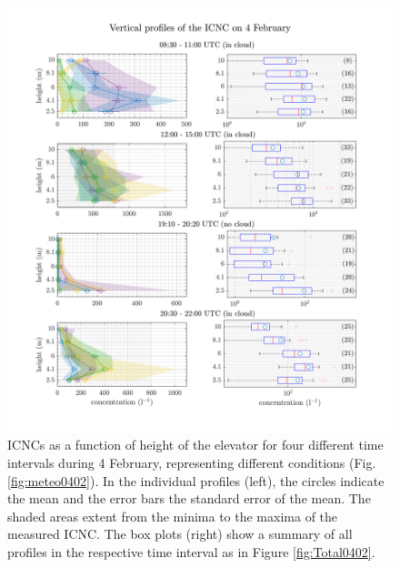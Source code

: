 \documentclass[draft,linenumbers]{agujournal}
\begin{document}
\begin{figure}[t]
 \centering
 	\includegraphics[width=14cm]{0402_Overview.png}
 \caption{ICNCs as a function of height of the elevator for four different time intervals during 4 February, representing different conditions (Fig. \ref{fig:meteo0402}). In the individual profiles (left), the circles indicate the mean and the error bars the standard error of the mean. The shaded areas extent from the minima to the maxima of the measured ICNC. The box plots (right) show a summary of all profiles in the respective time interval as in Figure \ref{fig:Total0402}.}
 \label{fig:profiles0402}
\end{figure}
\end{document}
